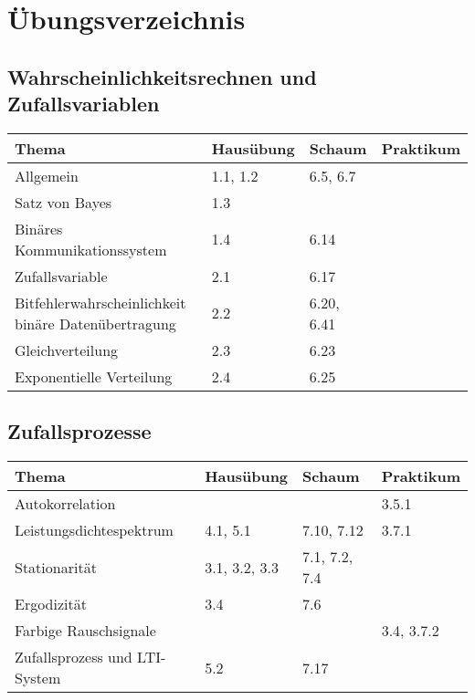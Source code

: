\section{Übungsverzeichnis}

\subsection{Wahrscheinlichkeitsrechnen und Zufallsvariablen}
	\begin{tabular}{|p{9cm}|p{2.5cm}|p{3.5cm}|p{2cm}|}
	\hline
	\textbf{Thema} & \textbf{Hausübung} & \textbf{Schaum} & \textbf{Praktikum} \\ 
	\hline
	\hline
	Allgemein & 1.1, 1.2 & 6.5, 6.7& \\
	\hline
	Satz von Bayes & 1.3 & & \\
	\hline
	Binäres Kommunikationssystem & 1.4 & 6.14 & \\
	\hline
	Zufallsvariable	& 2.1 & 6.17 &  \\
	\hline
	Bitfehlerwahrscheinlichkeit binäre Datenübertragung & 2.2 & 6.20, 6.41 & \\
	\hline
	Gleichverteilung & 2.3 & 6.23 & \\
	\hline
	Exponentielle Verteilung & 2.4 & 6.25 & \\
	\hline
	\end{tabular}
\subsection{Zufallsprozesse}
	\begin{tabular}{|p{9cm}|p{2.5cm}|p{3.5cm}|p{2cm}|}
	\hline
	\textbf{Thema} & \textbf{Hausübung} & \textbf{Schaum} & \textbf{Praktikum} \\ 
	\hline
	Autokorrelation	& & & 3.5.1 \\
	\hline
	Leistungsdichtespektrum & 4.1, 5.1 & 7.10, 7.12 & 3.7.1 \\
	\hline
	Stationarität & 3.1, 3.2, 3.3 & 7.1, 7.2, 7.4& \\
	\hline
	Ergodizität	 & 3.4 & 7.6 & \\
	\hline
	Farbige Rauschsignale & & & 3.4, 3.7.2\\
	\hline
	Zufallsprozess und LTI-System & 5.2 & 7.17 & \\
	\hline
	\end{tabular}
